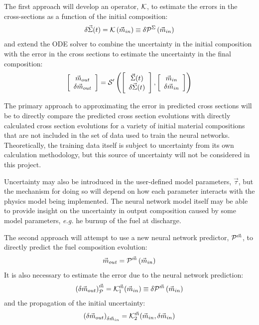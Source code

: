 \documentclass[dvips,11pt]{article}
\newcommand{\unc}[1]
{ \delta #1 }
\newcommand{\uncvector}[1]
{ \left[ \begin{array}{c} #1 \\ \delta #1 \end{array} \right] }
\begin{document}
The first approach will develop an operator, 
${\cal K}$, to
estimate the errors in the cross-sections as 
a function of the initial composition:
\begin{align}
  \delta\vec{\Sigma}(t)  = {\cal K}\left( \vec{m}_{in}\right)  \equiv  \unc{{\cal P}^\Sigma\left( \vec{m}_{in}\right)} \label{eq:NNSigmaError}
\end{align}
and extend the ODE solver to combine the
uncertainty in the initial composition with the
error in the cross sections to estimate the
uncertainty in the final composition:
\begin{align}
  \uncvector{\vec{m}_{out}} = {\cal S^\prime}\left( \uncvector{\vec{\Sigma}(t)}, \uncvector{\vec{m}_{in}}\right)
\end{align}

The primary approach to approximating the error in
predicted cross sections will be to directly
compare the predicted cross section evolutions
with directly calculated cross section evolutions
for a variety of initial material compositions that
are not included in the set of data used to train
the neural networks.  Theoretically, the training
data itself is subject to uncertainty from its own
calculation methodology, but this source of
uncertainty will not be considered in this
project.

Uncertainty may also be introduced in the
user-defined model parameters, $\vec{\tau}$, but the
mechanism for doing so will depend on how each
parameter interacts with the physics model being
implemented.  The neural network model itself may
be able to provide insight on the uncertainty in
output composition caused by some model
parameters, \textit{e.g.} he burnup of the fuel at
discharge.

The second approach will attempt to use a new
neural network predictor, ${\cal P}^{\vec{m}}$, to
directly predict the fuel composition evolution:
\begin{align} \vec{m}_{out} = {\cal P}^{\vec{m}}\left( \vec{m}_{in}\right)
\end{align}
It is also necessary to estimate the error due to
the neural network prediction:
\begin{align}
  \left(\unc{\vec{m}_{out}}\right)_{\cal P}^{\vec{m}}= {\cal K}_1^{{\vec{m}}}(\vec{m}_{in})  \equiv \unc{{\cal P}^{\vec{m}}\left( \vec{m}_{in}\right)} \label{eq:NNModError}
\end{align}
and the propagation of the initial uncertainty:
\begin{align}
  \left(\unc{\vec{m}_{out}}\right)_{\unc{\vec{m}_{in}}} = {\cal K}^{{\vec{m}}}_2(\vec{m}_{in}, \unc{\vec{m}_{in}})
\end{align}
\end{document}
